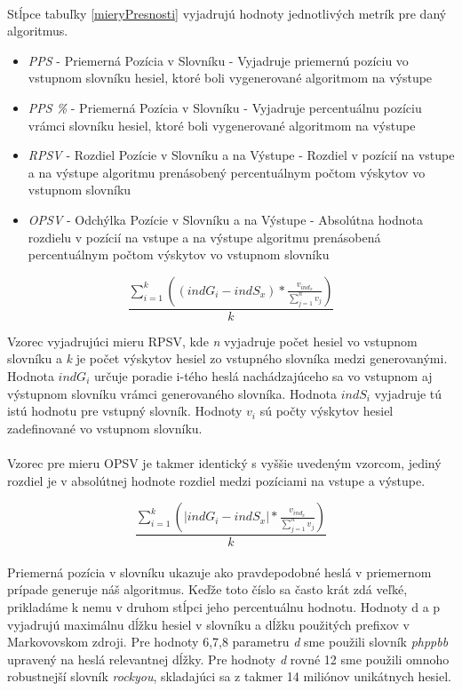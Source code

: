 \paragraph{}
Stĺpce tabuľky \ref{mieryPresnosti} vyjadrujú hodnoty jednotlivých metrík pre daný algoritmus.
\begin{itemize}
	\item \emph{PPS} - Priemerná Pozícia v Slovníku - Vyjadruje priemernú pozíciu vo vstupnom slovníku hesiel, ktoré boli vygenerované algoritmom na výstupe
	\item \emph{PPS \%} - Priemerná Pozícia v Slovníku - Vyjadruje percentuálnu pozíciu vrámci slovníku hesiel, ktoré boli vygenerované algoritmom na výstupe
	\item \emph{RPSV} - Rozdiel Pozície v Slovníku a na Výstupe - Rozdiel v pozícií na vstupe a na výstupe algoritmu prenásobený percentuálnym počtom výskytov vo vstupnom slovníku
    \item \emph{OPSV} - Odchýlka Pozície v Slovníku a na Výstupe - Absolútna hodnota rozdielu v pozícií na vstupe a na výstupe algoritmu prenásobená percentuálnym počtom výskytov vo vstupnom slovníku
\end{itemize}

\[ \frac{\displaystyle\sum_{i=1}^{k}((indG_i - indS_x) * \frac{v_{ind_x}}{\sum_{j=1}^{n}v_j})}{k} \]

Vzorec vyjadrujúci mieru RPSV, kde \emph{n} vyjadruje počet hesiel vo vstupnom slovníku a \emph{k} je počet výskytov hesiel zo vstupného slovníka medzi generovanými. Hodnota \emph{\(indG_i\)} určuje poradie i-tého heslá nachádzajúceho sa vo vstupnom aj výstupnom slovníku vrámci generovaného slovníka. Hodnota \emph{\(indS_i\)} vyjadruje tú istú hodnotu pre vstupný slovník. Hodnoty \emph{\(v_i\)} sú počty výskytov hesiel zadefinované vo vstupnom slovníku.

\paragraph{}
Vzorec pre mieru OPSV je takmer identický s vyššie uvedeným vzorcom, jediný rozdiel je v absolútnej hodnote rozdiel medzi pozíciami na vstupe a výstupe.

\[ \frac{\displaystyle\sum_{i=1}^{k}(|indG_i - indS_x| * \frac{v_{ind_x}}{\sum_{j=1}^{n}v_j})}{k} \]

\paragraph{}
Priemerná pozícia v slovníku ukazuje ako pravdepodobné heslá v priemernom prípade generuje náš algoritmus. Keďže toto číslo sa často krát zdá veľké, prikladáme k nemu v druhom stĺpci jeho percentuálnu hodnotu. Hodnoty d a p vyjadrujú maximálnu dĺžku hesiel v slovníku a dĺžku použitých prefixov v Markovovskom zdroji. Pre hodnoty 6,7,8 parametru \emph{d} sme použili slovník \emph{phppbb} upravený na heslá relevantnej dĺžky. Pre hodnoty \emph{d} rovné 12 sme použili omnoho robustnejší slovník \emph{rockyou}, skladajúci sa z takmer 14 miliónov unikátnych hesiel.

